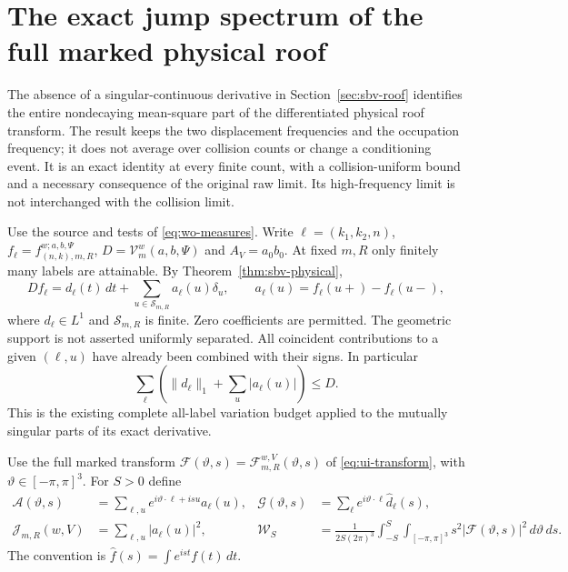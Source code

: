 \section{The exact jump spectrum of the full marked physical roof}
\label{sec:js-spectrum}

The absence of a singular-continuous derivative in
Section~\ref{sec:sbv-roof} identifies the entire nondecaying
mean-square part of the differentiated physical roof transform.
The result keeps the two displacement frequencies and the
occupation frequency; it does not average over collision counts
or change a conditioning event. It is an exact identity at
every finite count, with a collision-uniform bound and a necessary
consequence of the original raw limit. Its high-frequency limit
is not interchanged with the collision limit.

Use the source and tests of \eqref{eq:wo-measures}. Write
$\ell=(k_1,k_2,n)$, $f_\ell=f^{w;a,b,\Psi}_{(n,k),m,R}$,
$D=\mathcal V_m^w(a,b,\Psi)$ and $A_V=a_0b_0$. At fixed $m,R$
only finitely many labels are attainable. By
Theorem~\ref{thm:sbv-physical},
\begin{equation}\label{eq:js-decomposition}
 Df_\ell=d_\ell(t)\,dt+
       \sum_{u\in\mathcal S_{m,R}}a_\ell(u)\delta_u,\qquad
 a_\ell(u)=f_\ell(u+)-f_\ell(u-),
\end{equation}
where $d_\ell\in L^1$ and $\mathcal S_{m,R}$ is finite.
Zero coefficients are permitted. The geometric support is not
asserted uniformly separated. All coincident contributions to
a given $(\ell,u)$ have already been combined with their signs.
In particular
\begin{equation}\label{eq:js-budget}
 \sum_\ell\left(\|d_\ell\|_1+\sum_u|a_\ell(u)|\right)\le D.
\end{equation}
This is the existing complete all-label variation budget applied
to the mutually singular parts of its exact derivative.

Use the full marked transform
$\mathcal F(\vartheta,s)=\mathcal F_{m,R}^{w,V}(\vartheta,s)$
of \eqref{eq:ui-transform}, with
$\vartheta\in[-\pi,\pi]^3$. For $S>0$ define
\begin{align}
 \mathcal A(\vartheta,s)
 &=\sum_{\ell,u}e^{i\vartheta\cdot\ell+isu}a_\ell(u),&
 \mathcal G(\vartheta,s)
 &=\sum_\ell e^{i\vartheta\cdot\ell}\widehat d_\ell(s),
                                                   \label{eq:js-transforms}\\
 \mathcal J_{m,R}(w,V)&=\sum_{\ell,u}|a_\ell(u)|^2,&
 \mathcal W_S&=\frac1{2S(2\pi)^3}
 \int_{-S}^S\int_{[-\pi,\pi]^3}
       s^2|\mathcal F(\vartheta,s)|^2\,d\vartheta\,ds.
                                                   \label{eq:js-energy}
\end{align}
The convention is $\widehat f(s)=\int e^{ist}f(t)\,dt$.

